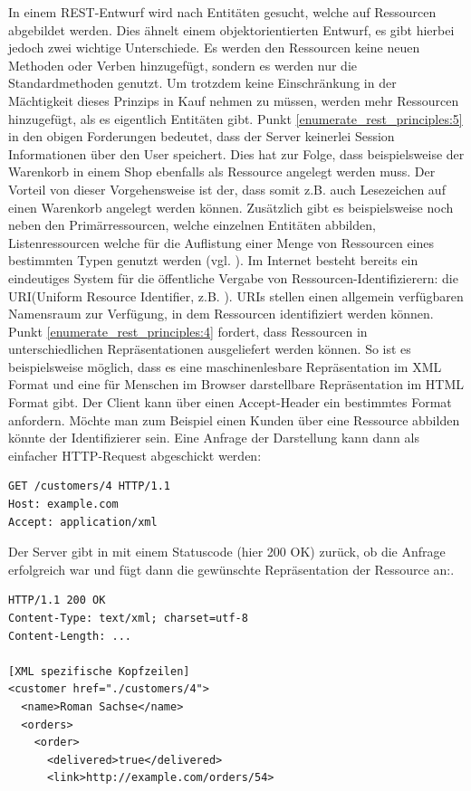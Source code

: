 In einem REST-Entwurf wird nach Entitäten gesucht, welche auf Ressourcen abgebildet werden. Dies ähnelt einem objektorientierten Entwurf, es gibt hierbei jedoch zwei wichtige Unterschiede. Es werden den Ressourcen keine neuen Methoden oder Verben hinzugefügt, sondern es werden nur die Standardmethoden genutzt. Um trotzdem keine Einschränkung in der Mächtigkeit dieses Prinzips in Kauf nehmen zu müssen, werden mehr Ressourcen hinzugefügt, als es eigentlich Entitäten gibt. Punkt \ref{enumerate_rest_principles:5} in den obigen Forderungen bedeutet, dass der Server keinerlei Session Informationen über den User speichert. Dies hat zur Folge, dass beispielsweise der Warenkorb in einem Shop ebenfalls als Ressource angelegt werden muss. Der Vorteil von dieser Vorgehensweise ist der, dass somit z.B. auch Lesezeichen auf einen Warenkorb angelegt werden können. Zusätzlich gibt es beispielsweise noch neben den Primärressourcen, welche einzelnen Entitäten abbilden, Listenressourcen welche für die Auflistung einer Menge von Ressourcen eines bestimmten Typen genutzt werden (vgl. \cite{tilkovrestchapter4}). Im Internet besteht bereits ein eindeutiges System für die öffentliche Vergabe von Ressourcen-Identifizierern: die URI(Uniform Resource Identifier, z.B. ). URIs stellen einen allgemein verfügbaren Namensraum zur Verfügung, in dem Ressourcen identifiziert werden können. Punkt \ref{enumerate_rest_principles:4} fordert, dass Ressourcen in unterschiedlichen Repräsentationen ausgeliefert werden können. So ist es beispielsweise möglich, dass es eine maschinenlesbare Repräsentation im XML Format und eine für Menschen im Browser darstellbare Repräsentation im HTML Format gibt. Der Client kann über einen Accept-Header ein bestimmtes Format anfordern.
Möchte man zum Beispiel einen Kunden über eine Ressource abbilden könnte der Identifizierer  sein. Eine Anfrage der Darstellung kann dann als einfacher HTTP-Request abgeschickt werden:
\begin{lstlisting}
GET /customers/4 HTTP/1.1
Host: example.com
Accept: application/xml 
\end{lstlisting}
Der Server gibt in mit einem Statuscode (hier 200 OK) zurück, ob die Anfrage erfolgreich war und fügt dann die gewünschte Repräsentation der Ressource an:.
\begin{lstlisting}
HTTP/1.1 200 OK
Content-Type: text/xml; charset=utf-8
Content-Length: ...

[XML spezifische Kopfzeilen]
<customer href="./customers/4">
  <name>Roman Sachse</name>
  <orders>
    <order>
      <delivered>true</delivered>
      <link>http://example.com/orders/54>
\end{lstlisting}
